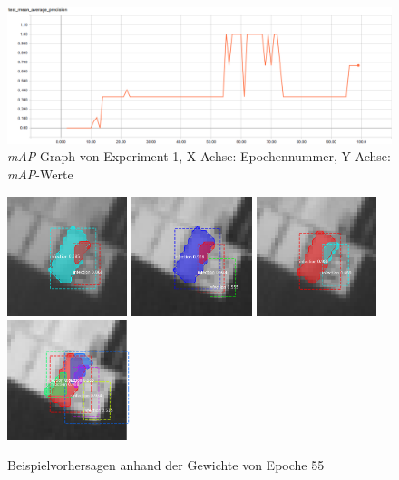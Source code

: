 \begin{figure}[ht]
	\centering
    \includegraphics[width=.7\textwidth]{pics/map-1.PNG}
    \caption{\textit{mAP}-Graph von Experiment 1, X-Achse: Epochennummer, Y-Achse: \textit{mAP}-Werte}
    \label{fig:map-1}
\end{figure}
\begin{figure}[ht]
	\centering
    \includegraphics[height=3.5cm]{pics/pred-1-1.png}
    \includegraphics[height=3.5cm]{pics/pred-1-2.png}
    \includegraphics[height=3.5cm]{pics/pred-1-3.png}
    \includegraphics[height=3.5cm]{pics/pred-1-4.png}
    \caption[Beispielvorhersagen Experiment 1]{Beispielvorhersagen anhand der Gewichte von Epoche 55}
    \label{fig:pred-1}
\end{figure}
